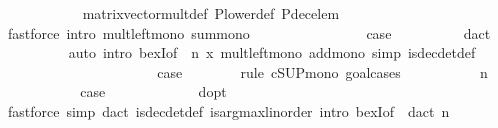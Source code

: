 \begin{isabellebody}
\ \ \ \ \ \ \ \ \ \ \isamarkupfalse%
\ matrix{\isacharunderscore}{\kern0pt}vector{\isacharunderscore}{\kern0pt}mult{\isacharunderscore}{\kern0pt}def\ P{\isacharunderscore}{\kern0pt}lower{\isacharunderscore}{\kern0pt}def\ P{\isacharunderscore}{\kern0pt}dec{\isacharunderscore}{\kern0pt}elem\isanewline
\ \ \ \ \ \ \ \ \ \ \isamarkupfalse%
\ {\isacharparenleft}{\kern0pt}fastforce\ intro{\isacharbang}{\kern0pt}{\isacharcolon}{\kern0pt}\ mult{\isacharunderscore}{\kern0pt}left{\isacharunderscore}{\kern0pt}mono\ sum{\isacharunderscore}{\kern0pt}mono{\isacharparenright}{\kern0pt}\isanewline
\ \ \ \ \ \ \isacommand{{\isacharbraceright}{\kern0pt}}\isamarkupfalse%
\isanewline
\ \ \ \ \ \ \isamarkupfalse%
\ \isamarkupfalse%
\ {\isacharquery}{\kern0pt}case\isanewline
\ \ \ \ \ \ \ \ \isamarkupfalse%
\ d{\isacharunderscore}{\kern0pt}act\isanewline
\ \ \ \ \ \ \ \ \isamarkupfalse%
\ {\isacharparenleft}{\kern0pt}auto\ intro{\isacharbang}{\kern0pt}{\isacharcolon}{\kern0pt}\ bexI{\isacharbrackleft}{\kern0pt}of\ {\isacharunderscore}{\kern0pt}\ {\isachardoublequoteopen}n\ x{\isachardoublequoteclose}{\isacharbrackright}{\kern0pt}\ mult{\isacharunderscore}{\kern0pt}left{\isacharunderscore}{\kern0pt}mono\ add{\isacharunderscore}{\kern0pt}mono\ simp{\isacharcolon}{\kern0pt}\ is{\isacharunderscore}{\kern0pt}dec{\isacharunderscore}{\kern0pt}det{\isacharunderscore}{\kern0pt}def{\isacharparenright}{\kern0pt}\isanewline
\ \ \ \ \isamarkupfalse%
\isanewline
\ \ \ \ \ \ \isamarkupfalse%
\ {}\isanewline
\ \ \ \ \ \ \isamarkupfalse%
\ \isamarkupfalse%
\ {\isacharquery}{\kern0pt}case\isanewline
\ \ \ \ \ \ \isamarkupfalse%
\ {\isacharparenleft}{\kern0pt}rule\ cSUP{\isacharunderscore}{\kern0pt}mono{\isacharcomma}{\kern0pt}\ goal{\isacharunderscore}{\kern0pt}cases{\isacharparenright}{\kern0pt}\isanewline
\ \ \ \ \ \ \ \ \isamarkupfalse%
\ {\isacharparenleft}{\kern0pt}{}\ n{\isacharparenright}{\kern0pt}\isanewline
\ \ \ \ \ \ \ \ \isamarkupfalse%
\ \isamarkupfalse%
\ {\isacharquery}{\kern0pt}case\ \isanewline
\ \ \ \ \ \ \ \ \ \ \isamarkupfalse%
\ d{\isacharunderscore}{\kern0pt}opt\isanewline
\ \ \ \ \ \ \ \ \ \ \isamarkupfalse%
\ {\isacharparenleft}{\kern0pt}fastforce\ simp{\isacharcolon}{\kern0pt}\ d{\isacharunderscore}{\kern0pt}act\ is{\isacharunderscore}{\kern0pt}dec{\isacharunderscore}{\kern0pt}det{\isacharunderscore}{\kern0pt}def\ is{\isacharunderscore}{\kern0pt}arg{\isacharunderscore}{\kern0pt}max{\isacharunderscore}{\kern0pt}linorder\ intro{\isacharbang}{\kern0pt}{\isacharcolon}{\kern0pt}\ bexI{\isacharbrackleft}{\kern0pt}of\ {\isacharunderscore}{\kern0pt}\ {\isachardoublequoteopen}d{\isacharunderscore}{\kern0pt}act\ n{\isachardoublequoteclose}{\isacharbrackright}{\kern0pt}{\isacharparenright}{\kern0pt}\isanewline

\end{isabellebody}

